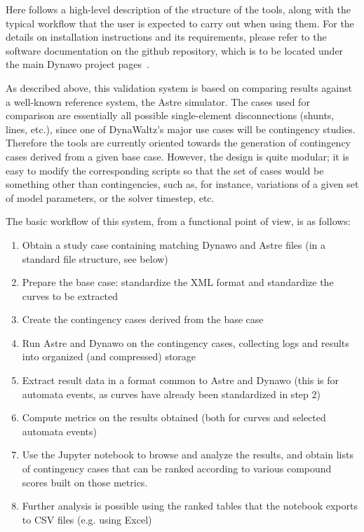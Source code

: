\documentclass[conference]{IEEEtran}
\begin{document}
Here follows a high-level description of the structure of the tools, along with
the typical workflow that the user is expected to carry out when using them.
For the details on installation instructions and its requirements, please refer
to the software documentation on the github repository, which is to be located
under the main Dynawo project pages~\cite{DwoGitRepos}.

As described above, this validation system is based on comparing results against
a well-known reference system, the Astre simulator. The cases used for
comparison are essentially all possible single-element disconnections (shunts,
lines, etc.), since one of DynaWaltz's major use cases will be contingency
studies. Therefore the tools are currently oriented towards the generation of
contingency cases derived from a given base case. However, the design is quite
modular; it is easy to modify the corresponding scripts so that the set of cases
would be something other than contingencies, such as, for instance, variations
of a given set of model parameters, or the solver timestep, etc.


The basic workflow of this system, from a functional point of view, is
as follows:
\begin{enumerate}
  \item Obtain a study case containing matching Dynawo and Astre files
        (in a standard file structure, see below)
  \item Prepare the base case: standardize the XML format and
        standardize the curves to be extracted
  \item Create the contingency cases derived from the base case
  \item Run Astre and Dynawo on the contingency cases, collecting logs
        and results into organized (and compressed) storage
  \item Extract result data in a format common to Astre and Dynawo
        (this is for automata events, as curves have already been
        standardized in step 2)
  \item Compute metrics on the results obtained (both for curves and
        selected automata events)
  \item Use the Jupyter notebook to browse and analyze the results,
        and obtain lists of contingency cases that can be ranked according
        to various compound scores built on those metrics.
  \item Further analysis is possible using the ranked tables that the
        notebook exports to CSV files (e.g. using Excel)
\end{enumerate}
\end{document}
